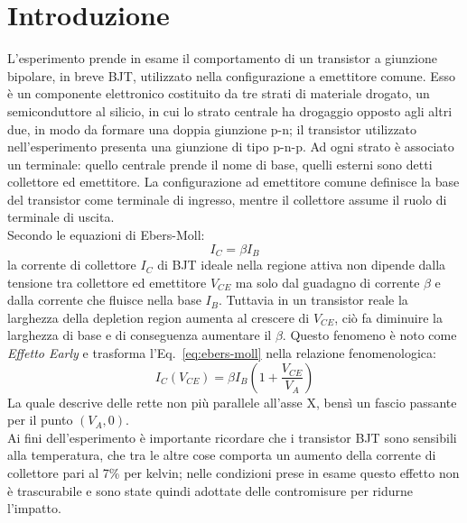 \documentclass[../main.tex]{subfiles}
\begin{document}
    \section{Introduzione} \label{sec:introduzione}

    L'esperimento prende in esame il comportamento di un transistor a giunzione bipolare,
    in breve BJT, utilizzato nella configurazione a emettitore comune.
    Esso è un componente elettronico costituito da tre strati di materiale drogato,
    un semiconduttore al silicio, in cui lo strato centrale ha drogaggio opposto agli
    altri due, in modo da formare una doppia giunzione p-n; il transistor
    utilizzato nell'esperimento presenta una giunzione di tipo p-n-p.
    Ad ogni strato è associato un terminale: quello centrale prende il nome di base,
    quelli esterni sono detti collettore ed emettitore.
    La configurazione ad emettitore comune definisce la base del transistor come
    terminale di ingresso, mentre il collettore assume il ruolo di terminale di uscita.\\

    Secondo le equazioni di Ebers-Moll:
    \begin{equation}
        I_C = \beta I_B
        \label{eq:ebers-moll}
    \end{equation}
    la corrente di collettore $I_C$ di BJT ideale nella regione
    attiva non dipende dalla tensione tra collettore ed
    emettitore $V_{CE}$ ma solo dal guadagno di corrente $\beta$ e
    dalla corrente che fluisce nella base $I_B$.
    Tuttavia in un transistor reale la larghezza della depletion
    region aumenta al crescere di $V_{CE}$, ciò fa diminuire la
    larghezza di base e di conseguenza aumentare il $\beta$.
    Questo fenomeno è noto come \textit{Effetto Early} e trasforma
    l'Eq.~\eqref{eq:ebers-moll} nella relazione fenomenologica:
    \begin{equation}
        I_C(V_{CE}) = \beta I_B \left( 1 + \frac{V_{CE}}{V_A} \right)
        \label{eq:early}
    \end{equation}
    La quale descrive delle rette non più parallele all'asse X,
    bensì un fascio passante per il punto $(V_A, 0)$.\\

    Ai fini dell'esperimento è importante ricordare che i transistor BJT sono sensibili
    alla temperatura, che tra le altre cose comporta un aumento della
    corrente di collettore pari al 7\% per kelvin; nelle condizioni prese in esame
    questo effetto non è trascurabile e sono state quindi adottate delle contromisure per
    ridurne l'impatto.\\
\end{document}
